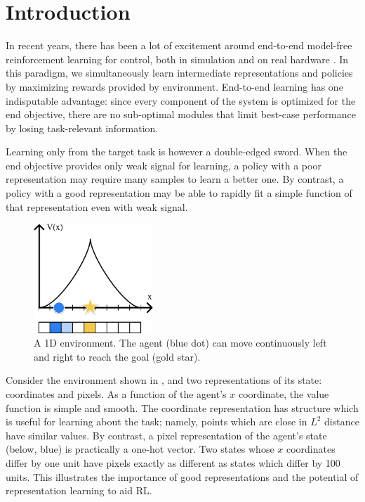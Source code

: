 \section{Introduction}

In recent years, there has been a lot of excitement around end-to-end model-free reinforcement learning for control, both in simulation \citep{lillicrap2015continuous, andrychowicz2018learning, haarnoja2018soft, fujimoto2018addressing} and on real hardware \citep{kalashnikov2018qt, haarnoja2018softapp}.
In this paradigm, we simultaneously learn intermediate representations and policies by maximizing rewards provided by environment.
End-to-end learning has one indisputable advantage: since every component of the system is optimized for the end objective, there are no sub-optimal modules that limit best-case performance by losing task-relevant information.

Learning only from the target task is however a double-edged sword.
When the end objective provides only weak signal for learning, a policy with a poor representation may require many samples to learn a better one.
By contrast, a policy with a good representation may be able to rapidly fit a simple function of that representation even with weak signal.



\begin{figure}[h]
    \centering
    \includegraphics[width=0.4\textwidth]{figures/dyne/env_illustration_1d.pdf}
    \caption{A 1D environment. The agent (blue dot) can move continuously left and right to reach the goal (gold star).}
    \label{fig:pixel_illustration}
\end{figure}

Consider the environment shown in , and two representations of its state: coordinates and pixels.
As a function of the agent's $x$ coordinate, the value function is simple and smooth.
The coordinate representation has structure which is useful for learning about the task; namely, points which are close in $L^2$ distance have similar values.
By contrast, a pixel representation of the agent's state (below, blue) is practically a one-hot vector.
Two states whose $x$ coordinates differ by one unit have pixels exactly as different as states which differ by 100 units.
This illustrates the importance of good representations and the potential of representation learning to aid RL.

